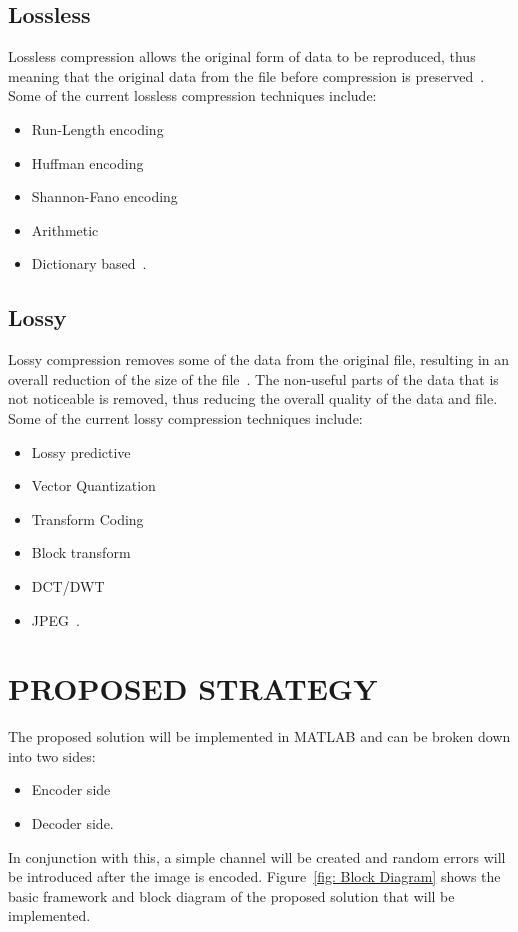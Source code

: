 \documentclass[10pt,twocolumn, a4paper]{witseiepaper}
\begin{document}
\subsection{Lossless}
\label{sec: Lossless}
Lossless compression allows the original form of data to be reproduced, thus meaning that the original data from the file before compression is preserved~\cite{Loss}. Some of the current lossless compression techniques include:
\begin{itemize}
\item Run-Length encoding
\item Huffman encoding
\item Shannon-Fano encoding
\item Arithmetic
\item Dictionary based~\cite{DiffTech}.
\end{itemize}


\subsection{Lossy}
\label{sec: Lossy}
Lossy compression removes some of the data from the original file, resulting in an overall reduction of the size of the file~\cite{Loss}. The non-useful parts of the data that is not noticeable is removed, thus reducing the overall quality of the data and file. Some of the current lossy compression techniques include:
\begin{itemize}
\item Lossy predictive
\item Vector Quantization
\item Transform Coding
\item Block transform
\item DCT/DWT
\item JPEG~\cite{DiffTech}.
\end{itemize}

%
\section{PROPOSED STRATEGY}
\label{sec: Proposed Strategy}
The proposed solution will be implemented in MATLAB and can be broken down into two sides:
\begin{itemize}
\item Encoder side
\item Decoder side.
\end{itemize}
In conjunction with this, a simple channel will be created and random errors will be introduced after the image is encoded. Figure~\ref{fig: Block Diagram} shows the basic framework and block diagram of the proposed solution that will be implemented.
\end{document}

